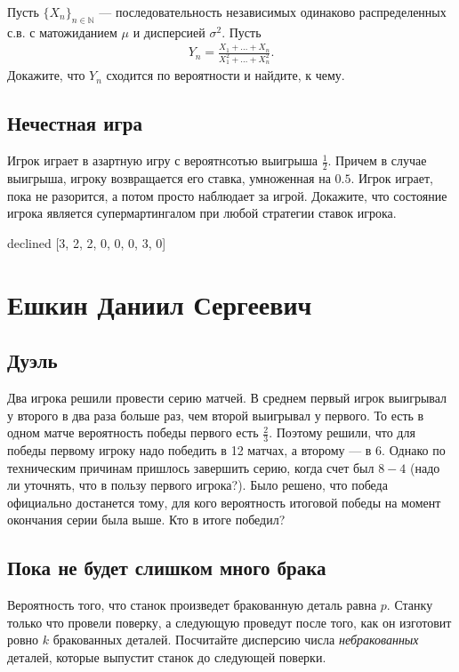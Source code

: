 \documentclass[12pt]{article}
\newcommand\N{\mathbb{N}}
\begin{document}
Пусть $\{X_n\}_{n \in \N}$ --- последовательность независимых одинаково распределенных с.в. с матожиданием $\mu$ и дисперсией $\sigma^2$. Пусть 
\begin{align*}
    Y_n = \frac{X_1 + \dots + X_n}{X_1^2 + \dots + X_n^2}.
\end{align*}
Докажите, что $Y_n$ сходится по вероятности и найдите, к чему.



\subsection{Нечестная игра}

Игрок играет в азартную игру с вероятнсотью выигрыша $\frac{1}{2}$. Причем в случае выигрыша, игроку возвращается его ставка, умноженная на $0.5$. Игрок играет, пока не разорится, а потом просто наблюдает за игрой. Докажите, что состояние игрока является супермартингалом при любой стратегии ставок игрока.



\newpage
declined  [3, 2, 2, 0, 0, 0, 3, 0]
\section{Ешкин Даниил Сергеевич}

\subsection{Дуэль}

Два игрока решили провести серию матчей. В среднем первый игрок выигрывал у второго в два раза больше раз, чем второй выигрывал у первого. То есть в одном матче вероятность победы первого есть $\frac{2}{3}$. Поэтому решили, что для победы первому игроку надо победить в 12 матчах, а второму --- в 6. Однако по техническим причинам пришлось завершить серию, когда счет был $8-4$ (надо ли уточнять, что в пользу первого игрока?). Было решено, что победа официально достанется тому, для кого вероятность итоговой победы на момент окончания серии была выше. Кто в итоге победил?



\subsection{Пока не будет слишком много брака}

Вероятность того, что станок произведет бракованную деталь равна $p$. Станку только что провели поверку, а следующую проведут после того, как он изготовит ровно $k$ бракованных деталей. Посчитайте дисперсию числа \emph{небракованных} деталей, которые выпустит станок до следующей поверки.
\end{document}
